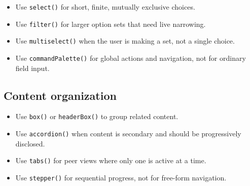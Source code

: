 \begin{itemize}
\tightlist
\item
  Use \texttt{s\allowbreak{}e\allowbreak{}l\allowbreak{}e\allowbreak{}c\allowbreak{}t\allowbreak{}(\allowbreak{})} for short, finite, mutually exclusive choices.
\item
  Use \texttt{f\allowbreak{}i\allowbreak{}l\allowbreak{}t\allowbreak{}e\allowbreak{}r\allowbreak{}(\allowbreak{})} for larger option sets that need live narrowing.
\item
  Use \texttt{m\allowbreak{}u\allowbreak{}l\allowbreak{}t\allowbreak{}i\allowbreak{}s\allowbreak{}e\allowbreak{}l\allowbreak{}e\allowbreak{}c\allowbreak{}t\allowbreak{}(\allowbreak{})} when the user is making a set, not a single choice.
\item
  Use \texttt{c\allowbreak{}o\allowbreak{}m\allowbreak{}m\allowbreak{}a\allowbreak{}n\allowbreak{}d\allowbreak{}P\allowbreak{}a\allowbreak{}l\allowbreak{}e\allowbreak{}t\allowbreak{}t\allowbreak{}e\allowbreak{}(\allowbreak{})} for global actions and navigation, not for ordinary field input.
\end{itemize}

\subsection{Content organization}\label{record-425-content-organization}

\begin{itemize}
\tightlist
\item
  Use \texttt{b\allowbreak{}o\allowbreak{}x\allowbreak{}(\allowbreak{})} or \texttt{h\allowbreak{}e\allowbreak{}a\allowbreak{}d\allowbreak{}e\allowbreak{}r\allowbreak{}B\allowbreak{}o\allowbreak{}x\allowbreak{}(\allowbreak{})} to group related content.
\item
  Use \texttt{a\allowbreak{}c\allowbreak{}c\allowbreak{}o\allowbreak{}r\allowbreak{}d\allowbreak{}i\allowbreak{}o\allowbreak{}n\allowbreak{}(\allowbreak{})} when content is secondary and should be progressively disclosed.
\item
  Use \texttt{t\allowbreak{}a\allowbreak{}b\allowbreak{}s\allowbreak{}(\allowbreak{})} for peer views where only one is active at a time.
\item
  Use \texttt{s\allowbreak{}t\allowbreak{}e\allowbreak{}p\allowbreak{}p\allowbreak{}e\allowbreak{}r\allowbreak{}(\allowbreak{})} for sequential progress, not for free-form navigation.
\end{itemize}

